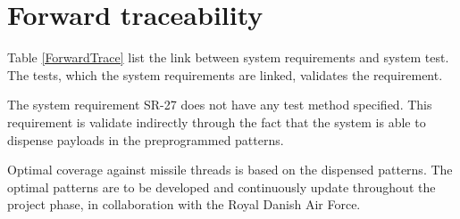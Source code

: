 \documentclass[Main]{subfiles}
\begin{document}
\chapter{Forward traceability}
Table \ref{ForwardTrace} list the link between system requirements and system test. The tests, which the system requirements are linked, validates the requirement. 

The system requirement SR-27 does not have any test method specified. 
This requirement is validate indirectly through the fact that the system is able to dispense payloads in the preprogrammed patterns.

Optimal coverage against missile threads is based on the dispensed patterns. The optimal patterns are to be developed and continuously update throughout the project phase, in collaboration with the Royal Danish Air Force.
\end{document}
